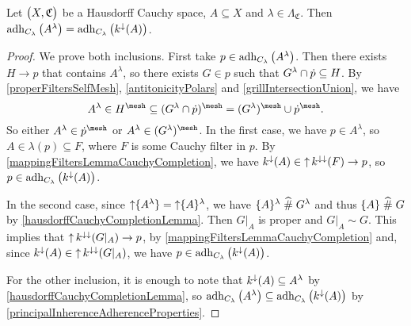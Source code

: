 \begin{lemma} \label{ReedCompletionAdherenceLemma}
Let $\sSet[\big]{X, \mathfrak{C}}$ be a Hausdorff Cauchy space, $A\subseteq X$ and $\lambda \in \Lambda_\mathfrak{C}$. Then $\operatorname{adh}_{C_\lambda}\big(A^\lambda\big) = \operatorname{adh}_{C_\lambda}\big(k^{\downarrow}(A)\big)$.
\end{lemma}
\begin{proof}
We prove both inclusions. First take $p\in \operatorname{adh}_{C_\lambda}\big(A^\lambda\big)$. Then there exists $H \to p$ that contains $A^\lambda$, so there exists $G\in p$ such that $G^\lambda \cap \dot{p}\subseteq H$. By \ref{properFiltersSelfMesh}, \ref{antitonicityPolars} and \ref{grillIntersectionUnion}, we have
\[ A^\lambda \in H^\mesh \subseteq (G^\lambda \cap \pfilter{p})^\mesh = (G^\lambda)^\mesh \cup \pfilter{p}^\mesh. \]
So either $A^\lambda \in \pfilter{p}^\mesh$ or $A^\lambda \in (G^\lambda)^\mesh$. In the first case, we have $p\in A^\lambda$, so $A\in\lambda(p)\subseteq F$, where $F$ is some Cauchy filter in $p$. By \ref{mappingFiltersLemmaCauchyCompletion}, we have $k^{\downarrow}(A)\in \operatorname{\uparrow} k^{\downarrow\downarrow}(F) \to p$, so $p\in \operatorname{adh}_{C_\lambda}\big(k^{\downarrow}(A)\big)$.

In the second case, since $\operatorname{\uparrow} \{A^\lambda\} = \operatorname{\uparrow} \{A\}^\lambda$, we have $\{A\}^\lambda \mathrel{\widehat{\#}} G^\lambda$ and thus $\{A\}\mathrel{\widehat{\#}} G$ by \ref{hausdorffCauchyCompletionLemma}. Then $G|_A$ is proper and $G|_A \sim G$. This implies that $\operatorname{\uparrow} k^{\downarrow\downarrow}(G|_A) \to p$, by \ref{mappingFiltersLemmaCauchyCompletion} and, since $k^\downarrow(A)\in \operatorname{\uparrow} k^{\downarrow\downarrow}(G|_A)$, we have $p\in \operatorname{adh}_{C_\lambda}\big(k^{\downarrow}(A)\big)$.

For the other inclusion, it is enough to note that $k^\downarrow(A) \subseteq A^\lambda$ by \ref{hausdorffCauchyCompletionLemma}, so $\operatorname{adh}_{C_\lambda}\big(A^\lambda\big) \subseteq \operatorname{adh}_{C_\lambda}\big(k^{\downarrow}(A)\big)$ by \ref{principalInherenceAdherenceProperties}.
\end{proof}

